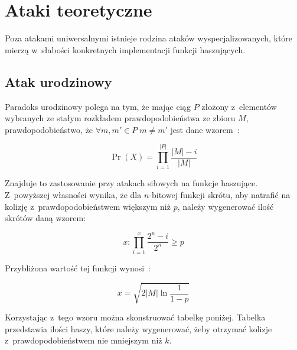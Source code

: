 \section{Ataki teoretyczne}
Poza atakami uniwersalnymi istnieje rodzina ataków wyspecjalizowanych, które
mierzą w~słabości konkretnych implementacji funkcji haszujących.

\subsection{Atak urodzinowy}
Paradoks urodzinowy polega na tym, że mając ciąg $P$ złożony z~elementów
wybranych ze stałym rozkładem prawdopodobieństwa ze zbioru $M$,
prawdopodobieństwo, że $\forall m, m' \in P \; m \neq m'$ jest dane
wzorem~\cite{birthday}:

$$ \Pr(X) = \prod_{i=1}^{|P|} \frac{|M|-i}{|M|} $$

Znajduje to zastosowanie przy atakach siłowych na funkcje haszujące.
Z~powyższej własności wynika, że dla $n$-bitowej funkcji skrótu, aby natrafić
na kolizję z~prawdopodobieństwem większym niż $p$, należy wygenerować
ilość skrótów daną wzorem:

$$ x : \prod_{i=1}^{x} \frac{2^n-i}{2^n} \geq p $$



Przybliżona wartość tej funkcji wynosi~\cite{birthday2}:

$$ x = \sqrt{2 |M| \ln{\frac{1}{1-p}}} $$

Korzystając z~tego wzoru można skonstruować tabelkę poniżej. Tabelka
przedstawia ilości haszy, które należy wygenerować, żeby otrzymać kolizje
z~prawdopodobieństwem nie mniejszym niż $k$.

